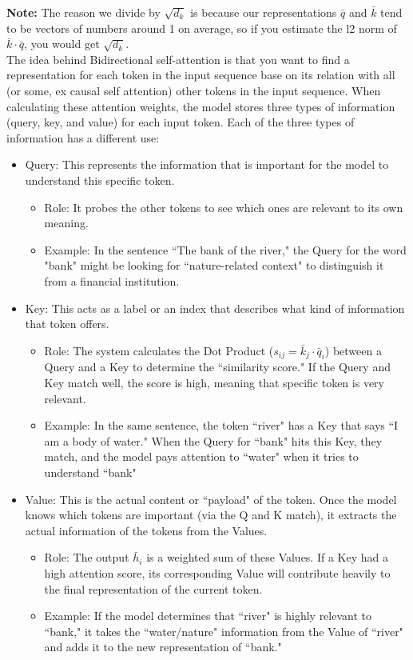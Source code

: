 \documentclass[12pt]{article}
\begin{document}
\textbf{Note:} The reason we divide by $\sqrt{d_k}$ is because our representations $\bar q$ and $\bar k$ tend to be vectors of numbers around 1 on average, so if you estimate the l2 norm of $\bar k \cdot \bar q$, you would get $\sqrt{d_k}$.\\

The idea behind Bidirectional self-attention is that you want to find a representation for each token in the input sequence base on its relation with all (or some, ex causal self attention) other tokens in the input sequence. When calculating these attention weights, the model stores three types of information (query, key, and value) for each input token. Each of the three types of information has a different use:

\begin{itemize}
	\item Query: This represents the information that is important for the model to understand this specific token. 
		\begin{itemize}
			\item Role: It probes the other tokens to see which ones are relevant to its own meaning.
			\item Example: In the sentence ``The bank of the river," the Query for the word "bank" might be looking for ``nature-related context" to distinguish it from a financial institution.
		\end{itemize}
	\item Key: This acts as a label or an index that describes what kind of information that token offers.
		\begin{itemize}
			\item Role: The system calculates the Dot Product ($s_{ij} = \bar{k}_j \cdot \bar{q}_i$) between a Query and a Key to determine the ``similarity score." If the Query and Key match well, the score is high, meaning that specific token is very relevant.
			\item Example: In the same sentence, the token ``river" has a Key that says ``I am a body of water." When the Query for ``bank" hits this Key, they match, and the model pays attention to ``water" when it tries to understand ``bank"
		\end{itemize}
	\item Value: This is the actual content or ``payload" of the token. Once the model knows which tokens are important (via the Q and K match), it extracts the actual information of the tokens from the Values.
		\begin{itemize}
			\item Role: The output $\bar{h}_i$ is a weighted sum of these Values. If a Key had a high attention score, its corresponding Value will contribute heavily to the final representation of the current token.
			\item Example: If the model determines that ``river" is highly relevant to ``bank," it takes the ``water/nature" information from the Value of ``river" and adds it to the new representation of ``bank."
		\end{itemize}
\end{itemize}
\end{document}
